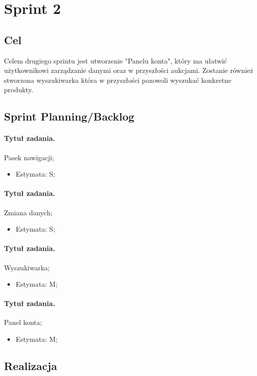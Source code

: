\documentclass[a4paper]{article}
\begin{document}
	\section{Sprint 2}
	
	\subsection{Cel} Celem drugiego sprintu jest utworzenie "Panelu konta", który ma ułatwić użytkownikowi zarządzanie danymi oraz w przyszłości aukcjami. Zostanie również stworzona wyszukiwarka która w przyszłości pozowoli wyszukać konkretne produkty.
	
	\subsection{Sprint Planning/Backlog}
	
	\paragraph{Tytuł zadania.} Pasek nawigacji;
	\begin{itemize}
		\item Estymata: S;
	\end{itemize}
	
	\paragraph{Tytuł zadania.} Zmiana danych;
	\begin{itemize}
		\item Estymata: S;
	\end{itemize}
	
	\paragraph{Tytuł zadania.} Wyszukiwarka;
	\begin{itemize}
		\item Estymata: M;
	\end{itemize}
	
	\paragraph{Tytuł zadania.} Panel konta;
	\begin{itemize}
		\item Estymata: M;
	\end{itemize}
	
	\subsection{Realizacja}
	
\end{document}
